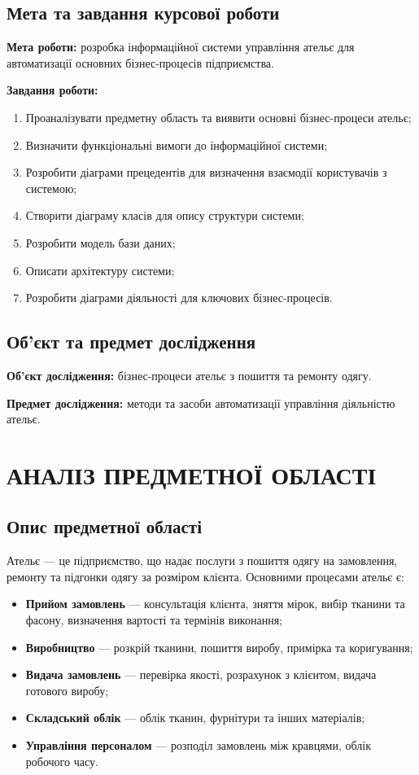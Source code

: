 \documentclass[14pt,a4paper]{extarticle}
\begin{document}
\subsection{Мета та завдання курсової роботи}

\textbf{Мета роботи:} розробка інформаційної системи управління ательє для автоматизації основних бізнес-процесів підприємства.

\textbf{Завдання роботи:}
\begin{enumerate}
    \item Проаналізувати предметну область та виявити основні бізнес-процеси ательє;
    \item Визначити функціональні вимоги до інформаційної системи;
    \item Розробити діаграми прецедентів для визначення взаємодії користувачів з системою;
    \item Створити діаграму класів для опису структури системи;
    \item Розробити модель бази даних;
    \item Описати архітектуру системи;
    \item Розробити діаграми діяльності для ключових бізнес-процесів.
\end{enumerate}

\subsection{Об'єкт та предмет дослідження}

\textbf{Об'єкт дослідження:} бізнес-процеси ательє з пошиття та ремонту одягу.

\textbf{Предмет дослідження:} методи та засоби автоматизації управління діяльністю ательє.

\newpage
\section{АНАЛІЗ ПРЕДМЕТНОЇ ОБЛАСТІ}

\subsection{Опис предметної області}

Ательє --- це підприємство, що надає послуги з пошиття одягу на замовлення, ремонту та підгонки одягу за розміром клієнта. Основними процесами ательє є:

\begin{itemize}
    \item \textbf{Прийом замовлень} --- консультація клієнта, зняття мірок, вибір тканини та фасону, визначення вартості та термінів виконання;
    \item \textbf{Виробництво} --- розкрій тканини, пошиття виробу, примірка та коригування;
    \item \textbf{Видача замовлень} --- перевірка якості, розрахунок з клієнтом, видача готового виробу;
    \item \textbf{Складський облік} --- облік тканин, фурнітури та інших матеріалів;
    \item \textbf{Управління персоналом} --- розподіл замовлень між кравцями, облік робочого часу.
\end{itemize}
\end{document}
